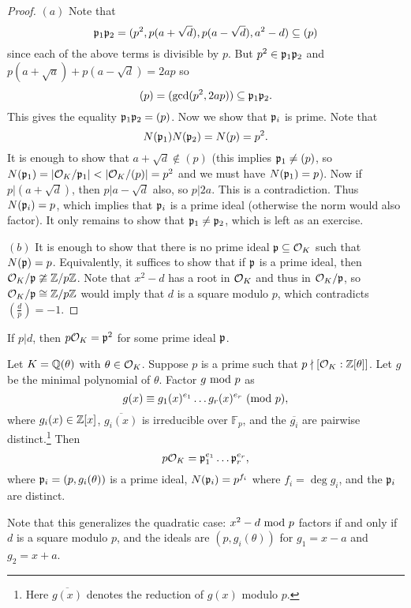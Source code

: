 \begin{proof}
  $(a)$ Note that
  \[
    \mathfrak{p}_1 \mathfrak{p}_2 = (p^2, p(a + \sqrt{d}), p(a - \sqrt{d}), a^2 - d) \subseteq (p)
  \]
  since each of the above terms is divisible by $p$.
  But $p^2 \in \mathfrak{p}_1 \mathfrak{p}_2$ and
  $p(a + \sqrt{a}) + p(a - \sqrt{d}) = 2ap$ so
  \[
    (p) = (\gcd(p^2, 2ap)) \subseteq \mathfrak{p}_1 \mathfrak{p}_2.
  \]
  This gives the equality $\mathfrak{p}_1 \mathfrak{p}_2 = (p)$. Now we
  show that $\mathfrak{p}_i$ is prime. Note that
  \[
    N(\mathfrak{p}_1) N(\mathfrak{p}_2) = N(p) = p^2.
  \]
  It is enough to show that $a + \sqrt{d} \notin (p)$
  (this implies $\mathfrak{p}_1 \ne (p)$, so
  $N(\mathfrak{p}_1) = |\mathcal{O}_K / \mathfrak{p}_1| < |\mathcal{O}_K / (p)| = p^2$ and
  we must have $N(\mathfrak{p}_1) = p$).
  Now if $p | (a + \sqrt{d})$, then
  $p | a - \sqrt{d}$ also, so $p | 2a$. This is a
  contradiction. Thus $N(\mathfrak{p}_i) = p$, which implies
  that $\mathfrak{p}_i$ is a prime ideal (otherwise the norm
  would also factor). It only remains to show that
  $\mathfrak{p}_1 \ne \mathfrak{p}_2$, which is left as an exercise.

  $(b)$ It is enough to show that there is no prime
  ideal $\mathfrak{p} \subseteq \mathcal{O}_K$ such that $N(\mathfrak{p}) = p$.
  Equivalently, it suffices to show that if $\mathfrak{p}$ is a
  prime ideal, then
  $\mathcal{O}_K / \mathfrak{p} \ncong \mathbb{Z} / p\mathbb{Z}$.  Note that $x^2 - d$
  has a root in $\mathcal{O}_K$ and thus in $\mathcal{O}_K / \mathfrak{p}$, so $\mathcal{O}_K / \mathfrak{p} \cong \mathbb{Z} / p\mathbb{Z}$ would imply that
  $d$ is a square modulo $p$, which contradicts $(\frac{d}{p}) = -1$.
\end{proof}

\begin{exercise}
  If $p | d$, then $p \mathcal{O}_K = \mathfrak{p}^2$ for some prime ideal
  $\mathfrak{p}$.
\end{exercise}

\begin{theorem}[Kummer]
  Let $K = \mathbb{Q}(\theta)$ with $\theta \in \mathcal{O}_K$.
  Suppose $p$ is a prime such that $p \nmid [\mathcal{O}_K : \mathbb{Z}[\theta]]$.
  Let $g$ be the minimal polynomial of $\theta$.
  Factor $g \ {\mathrm{mod}\ p}$ as
  \[
    g(x) \equiv g_1(x)^{e_1} \dots g_r(x)^{e_r} \ (\mathrm{mod}\ p),
  \]
  where $g_i(x) \in \mathbb{Z}[x]$, $\overline{g_i(x)}$ is
  irreducible over $\mathbb{F}_p$, and the
  $\overline{g_i}$ are pairwise distinct.\footnote{Here $\overline{g(x)}$ denotes the reduction of $g(x)$ modulo $p$.} Then
  \[
    p \mathcal{O}_K = \mathfrak{p}_1^{e_1} \dots \mathfrak{p}_r^{e_r},
  \]
  where $\mathfrak{p}_i = (p, g_i(\theta))$ is a prime ideal,
  $N(\mathfrak{p}_i) = p^{f_i}$ where
  $f_i = \deg g_i$, and the $\mathfrak{p}_i$ are distinct.
\end{theorem}

\begin{remark}
  Note that this generalizes the quadratic case:
  $x^2 - d \ {\mathrm{mod}\ p}$ factors if and only if $d$ is a
  square modulo $p$, and
  the ideals are $(p, g_i(\theta))$ for
  $g_1 = x - a$ and $g_2 = x + a$.
\end{remark}
